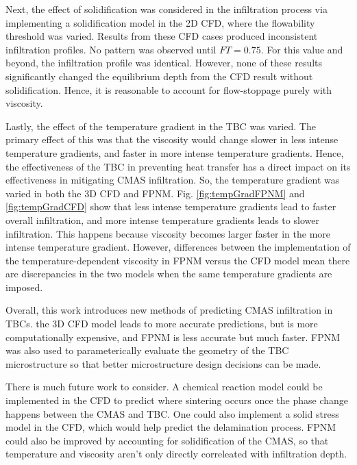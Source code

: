 \documentclass{UCF_ETD}
\begin{document}
Next, the effect of solidification was considered in the infiltration process via implementing a solidification model in the 2D CFD, where the flowability threshold was varied. 
Results from these CFD cases produced inconsistent infiltration profiles. 
No pattern was observed until $FT=0.75$. 
For this value and beyond, the infiltration profile was identical.
However, none of these results significantly changed the equilibrium depth from the CFD result without solidification.
Hence, it is reasonable to account for flow-stoppage purely with viscosity.

Lastly, the effect of the temperature gradient in the TBC was varied. The primary effect of this was that the viscosity would change slower in less intense temperature gradients, and faster in more intense temperature gradients. Hence, the effectiveness of the TBC in preventing heat transfer has a direct impact on its effectiveness in mitigating CMAS infiltration. So, the temperature gradient was varied in both the 3D CFD and FPNM. Fig. \ref{fig:tempGradFPNM} and \ref{fig:tempGradCFD} show that less intense temperature gradients lead to faster overall infiltration, and more intense temperature gradients leads to slower infiltration. This happens because viscosity becomes larger faster in the more intense temperature gradient. However, differences between the implementation of the temperature-dependent viscosity in FPNM versus the CFD model mean there are discrepancies in the two models when the same temperature gradients are imposed.

Overall, this work introduces new methods of predicting CMAS infiltration in TBCs. the 3D CFD model leads to more accurate predictions, but is more computationally expensive, and FPNM is less accurate but much faster. FPNM was also used to parameterically evaluate the geometry of the TBC microstructure so that better microstructure design decisions can be made. 

There is much future work to consider. A chemical reaction model could be implemented in the CFD to predict where sintering occurs once the phase change happens between the CMAS and TBC. One could also implement a solid stress model in the CFD, which would help predict the delamination process. FPNM could also be improved by accounting for solidification of the CMAS, so that temperature and viscosity aren't only directly correleated with infiltration depth.
\end{document}
